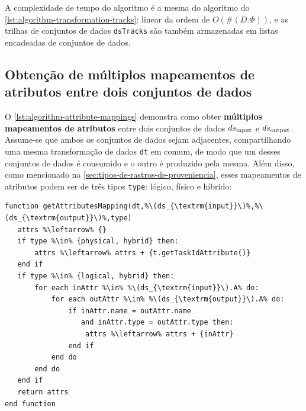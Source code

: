 A complexidade de tempo do algoritmo é a mesma do algoritmo do \autoref{lst:algorithm-transformation-tracks}: linear da ordem de \( O(\#(D.\Phi)) \), e as trilhas de conjuntos de dados \texttt{dsTracks} são também armazenadas em listas encadeadas de conjuntos de dados.

\subsection{Obtenção de múltiplos mapeamentos de atributos entre dois conjuntos de dados}

O \autoref{lst:algorithm-attribute-mappings} demonstra como obter \textbf{múltiplos mapeamentos de atributos} entre dois conjuntos de dados \(ds_{\textup{input}}\) e \(ds_{\textup{output}}\). Assume-se que ambos os conjuntos de dados sejam adjacentes, compartilhando uma mesma transformação de dados \texttt{dt} em comum, de modo que um desses conjuntos de dados é consumido e o outro é produzido pela mesma. Além disso, como mencionado na \autoref{sec:tipos-de-rastros-de-proveniencia}, esses mapeamentos de atributos podem ser de três tipos \texttt{type}: lógico, físico e híbrido:

\begin{minipage}[c]{0.95\textwidth}
\begin{lstlisting}[language=pseudocode,label={lst:algorithm-attribute-mappings},caption={[Obtenção de múltiplos mapeamentos de atributos]Obtenção de múltiplos mapeamentos de atributos entre dois conjuntos de dados adjacentes.}]
function getAttributesMapping(dt,%\(ds_{\textrm{input}}\)%,%\(ds_{\textrm{output}}\)%,type)
   attrs %\leftarrow% {}
   if type %\in% {physical, hybrid} then:
       attrs %\leftarrow% attrs + {t.getTaskIdAttribute()}
   end if
   if type %\in% {logical, hybrid} then:
       for each inAttr %\in% %\(ds_{\textrm{input}}\).A% do:
           for each outAttr %\in% %\(ds_{\textrm{output}}\).A% do:
               if inAttr.name = outAttr.name
                  and inAttr.type = outAttr.type then:
                   attrs %\leftarrow% attrs + {inAttr}
               end if
           end do
       end do
   end if
   return attrs
end function
\end{lstlisting}
\end{minipage}

